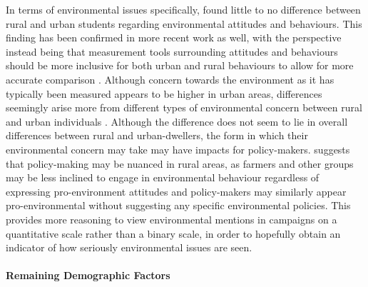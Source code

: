 \documentclass[preprint,12pt,authoryear]{elsarticle}
\begin{document}
In terms of environmental issues specifically, \citet{bognerEnvironmentalPerceptionRural1997} found little to no difference between rural and urban students regarding environmental attitudes and behaviours. This finding has been confirmed in more recent work as well, with the perspective instead being that measurement tools surrounding attitudes and behaviours should be more inclusive for both urban and rural behaviours to allow for more accurate comparison \citep{huddart-kennedyRuralUrbanDifferencesEnvironmental2009}. Although concern towards the environment as it has typically been measured appears to be higher in urban areas, differences seemingly arise more from different types of environmental concern between rural and urban individuals \citep{deberenguerRuralUrbanDifferencesEnvironmental2005}. Although the difference does not seem to lie in overall differences between rural and urban-dwellers, the form in which their environmental concern may take may have impacts for policy-makers. \citet{freudenburgRuralUrbanDifferencesEnvironmental1991} suggests that policy-making may be nuanced in rural areas, as farmers and other groups may be less inclined to engage in environmental behaviour regardless of expressing pro-environment attitudes and policy-makers may similarly appear pro-environmental without suggesting any specific environmental policies. This provides more reasoning to view environmental mentions in campaigns on a quantitative scale rather than a binary scale, in order to hopefully obtain an indicator of how seriously environmental issues are seen.

\paragraph{Remaining Demographic Factors}
\end{document}
